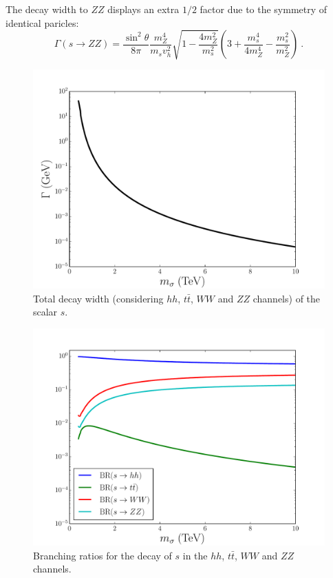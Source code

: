 \documentclass[aps,prd,preprintnumbers,nofootinbibn,twocolumn]{revtex4}
\begin{document}
The decay width to $ZZ$ displays an extra $1/2$ factor due to the symmetry of identical paricles:
\begin{equation}
\Gamma(s \rightarrow ZZ)=  \frac{\sin^2\theta }{8 \pi } \frac{m_Z^4}{m_s v_h^2} \sqrt{ 1- \frac{4 m_Z^2}{m_s^2}}
\left(3+\frac{m_s^4}{4 m_Z^4}-\frac{m_s^2}{m_Z^2} \right)\ .
\end{equation}

\begin{figure}[t]
\centering
\includegraphics[width=\columnwidth]{totalwidth}
\caption{Total decay width (considering $hh$, $t\bar{t}$, $WW$ and $ZZ$ channels) of the scalar $s$.}\label{fig:totalwidth}
\end{figure}
\begin{figure}[t]
\centering
\includegraphics[width=\columnwidth]{BR}
\caption{Branching ratios for the decay of $s$ in the $hh$, $t\bar{t}$, $WW$ and $ZZ$ channels.}\label{fig:BR}
\end{figure}
\end{document}
